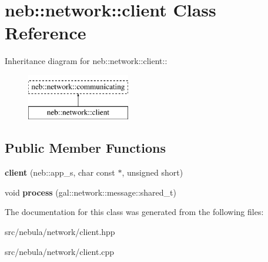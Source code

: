 \hypertarget{classneb_1_1network_1_1client}{
\section{neb::network::client Class Reference}
\label{classneb_1_1network_1_1client}
}
Inheritance diagram for neb::network::client::\begin{figure}[H]
\begin{center}
\leavevmode
\includegraphics[height=2cm]{classneb_1_1network_1_1client}
\end{center}
\end{figure}
\subsection*{Public Member Functions}
\begin{DoxyCompactItemize}
\item 
\hypertarget{classneb_1_1network_1_1client_a4f117f86f1d548c492645b47ca3b1fb0}{
{\bfseries client} (neb::app\_\-s, char const $\ast$, unsigned short)}
\label{classneb_1_1network_1_1client_a4f117f86f1d548c492645b47ca3b1fb0}

\item 
\hypertarget{classneb_1_1network_1_1client_a04d1cdc645678b66a0c0bdfcf9eb3c1d}{
void {\bfseries process} (gal::network::message::shared\_\-t)}
\label{classneb_1_1network_1_1client_a04d1cdc645678b66a0c0bdfcf9eb3c1d}

\end{DoxyCompactItemize}


The documentation for this class was generated from the following files:\begin{DoxyCompactItemize}
\item 
src/nebula/network/client.hpp\item 
src/nebula/network/client.cpp\end{DoxyCompactItemize}
